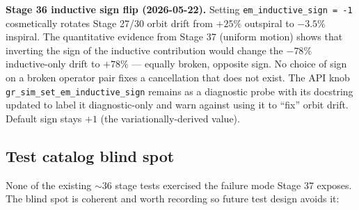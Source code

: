 \documentclass[11pt,a4paper]{article}
\begin{document}
\textbf{Stage 36 inductive sign flip (2026-05-22).}  Setting
\texttt{em\_inductive\_sign = -1} cosmetically rotates Stage 27/30
orbit drift from $+25\%$ outspiral to $-3.5\%$ inspiral.  The
quantitative evidence from Stage 37 (uniform motion) shows that
inverting the sign of the inductive contribution would change the
$-78\%$ inductive-only drift to $+78\%$ --- equally broken, opposite
sign.  No choice of sign on a broken operator pair fixes a
cancellation that does not exist.  The API knob
\texttt{gr\_sim\_set\_em\_inductive\_sign} remains as a diagnostic
probe with its docstring updated to label it diagnostic-only and warn
against using it to ``fix'' orbit drift.  Default sign stays $+1$ (the
variationally-derived value).

\subsection{Test catalog blind spot}

None of the existing $\sim 36$ stage tests exercised the failure mode
Stage 37 exposes.  The blind spot is coherent and worth recording so
future test design avoids it:
\end{document}
